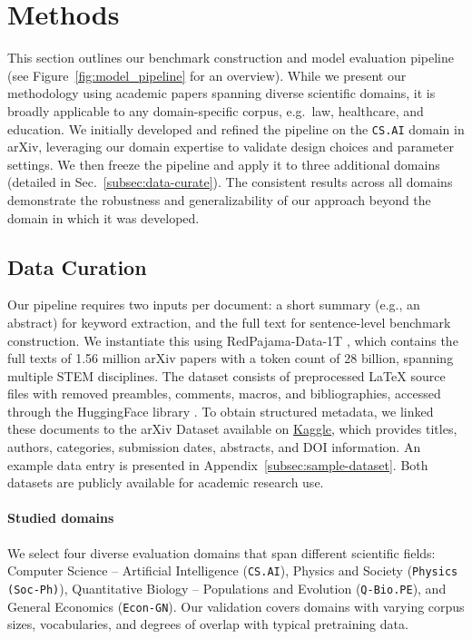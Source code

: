 \documentclass[10pt]{article}
\begin{document}
\section{Methods} \vspace*{-.25cm}
\label{sec:Methods}
This section outlines our benchmark construction and model evaluation pipeline (see Figure~\ref{fig:model_pipeline} for an overview). While we present our methodology using academic papers spanning diverse scientific domains, it is broadly applicable to any domain-specific corpus, e.g.\ law, healthcare, and education.
We initially developed and refined the pipeline on the \texttt{CS.AI} domain in arXiv, leveraging our domain expertise to validate design choices and parameter settings. We then freeze the pipeline and apply it to three additional domains (detailed in Sec.~\ref{subsec:data-curate}). The consistent results across all domains demonstrate the robustness and generalizability of our approach beyond the domain in which it was developed.

\subsection{Data Curation} \vspace*{-.15cm}
\label{subsec:data-curate}
Our pipeline requires two inputs per document: a short summary (e.g., an abstract) for keyword extraction, and the full text for sentence-level benchmark construction. We instantiate this using RedPajama-Data-1T \citep{together2023redpajama}, which contains the full texts of 1.56 million arXiv papers with a token count of 28 billion, spanning multiple STEM disciplines. The dataset consists of preprocessed LaTeX source files with removed preambles, comments, macros, and bibliographies, accessed through the HuggingFace library \citep{wolf2019huggingface}. To obtain structured metadata, we linked these documents to the arXiv Dataset available on \href{https://www.kaggle.com/datasets/Cornell-University/arxiv}{Kaggle}, which provides titles, authors, categories, submission dates, abstracts, and DOI information. An example data entry is presented in Appendix~\ref{subsec:sample-dataset}. Both datasets are publicly available for academic research use.

\paragraph{Studied domains} We select four diverse evaluation domains that span different scientific fields: Computer Science -- Artificial Intelligence (\texttt{CS.AI}), Physics and Society (\texttt{Physics (Soc-Ph)}), Quantitative Biology -- Populations and Evolution (\texttt{Q-Bio.PE}), and General Economics (\texttt{Econ-GN}). Our validation covers domains with varying corpus sizes, vocabularies, and degrees of overlap with typical pretraining data.
\end{document}
